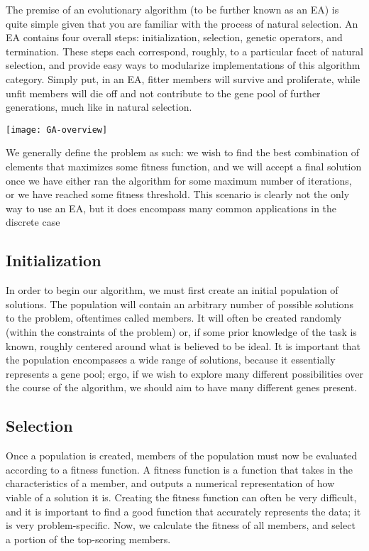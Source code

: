 The premise of an evolutionary algorithm (to be further known as an EA) is quite simple given that you are familiar with the process of natural selection. An EA contains four overall steps: initialization, selection, genetic operators, and termination. These steps each correspond, roughly, to a particular facet of natural selection, and provide easy ways to modularize implementations of this algorithm category. Simply put, in an EA, fitter members will survive and proliferate, while unfit members will die off and not contribute to the gene pool of further generations, much like in natural selection.

\begin{marginfigure}
\texttt{[image: GA-overview]}
\end{marginfigure}

We generally define the problem as such: we wish to find the best combination of elements that maximizes some fitness function, and we will accept a final solution once we have either ran the algorithm for some maximum number of iterations, or we have reached some fitness threshold. This scenario is clearly not the only way to use an EA, but it does encompass many common applications in the discrete case

\subsection{Initialization}
In order to begin our algorithm, we must first create an initial population of solutions. The population will contain an arbitrary number of possible solutions to the problem, oftentimes called members. It will often be created randomly (within the constraints of the problem) or, if some prior knowledge of the task is known, roughly centered around what is believed to be ideal. It is important that the population encompasses a wide range of solutions, because it essentially represents a gene pool; ergo, if we wish to explore many different possibilities over the course of the algorithm, we should aim to have many different genes present.

\subsection{Selection}
Once a population is created, members of the population must now be evaluated according to a fitness function. A fitness function is a function that takes in the characteristics of a member, and outputs a numerical representation of how viable of a solution it is. Creating the fitness function can often be very difficult, and it is important to find a good function that accurately represents the data; it is very problem-specific. Now, we calculate the fitness of all members, and select a portion of the top-scoring members.

